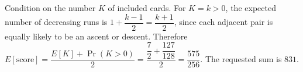 Condition on the number $K$ of included cards. For $K=k>0$, the expected number of decreasing runs is $1+\dfrac{k-1}{2}=\dfrac{k+1}{2}$, since each adjacent pair is equally likely to be an ascent or descent. Therefore $E[\text{score}]=\dfrac{E[K]+\Pr(K>0)}{2}=\dfrac{\dfrac{7}{2}+\dfrac{127}{128}}{2}=\dfrac{575}{256}$. The requested sum is $\boxed{831}$.
